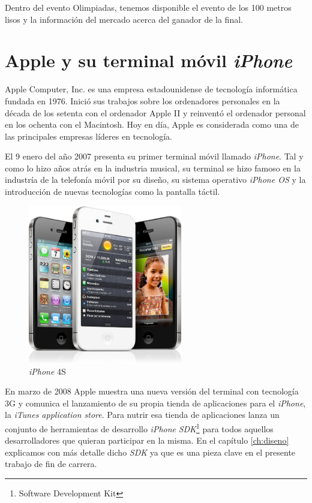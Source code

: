  Dentro del evento Olimpiadas, tenemos disponible el evento de los 100 metros lisos y la información del mercado acerca del ganador de la final.
 
\section{Apple y su terminal móvil \emph{iPhone}}
 
Apple Computer, Inc. es una empresa estadounidense de tecnología informática fundada en 1976. Inició sus trabajos sobre los ordenadores personales en la década de los setenta con el ordenador Apple II y reinventó el ordenador personal en los ochenta con el Macintosh. Hoy en día, Apple es considerada como una de las principales empresas líderes en tecnología.

El 9 enero del año 2007 presenta su primer terminal móvil llamado \emph{iPhone}. Tal y como lo hizo años atrás en la industria musical, su terminal se hizo famoso en la industría de la telefonía móvil por su diseño, su sistema operativo \emph{iPhone OS} y la introducción de nuevas tecnologías como la pantalla táctil.

\begin{figure} [h]
  \centering
    \includegraphics[width=0.6\textwidth]{./images/iphone4.jpg} 
  \caption{\emph{iPhone} 4S}
  \label{fig:iPhone-4GS}
\end{figure}
  
  En marzo de 2008 Apple muestra una nueva versión del terminal con tecnología 3G y comunica el lanzamiento de su propia tienda de aplicaciones para el \emph{iPhone}, la \emph{iTunes application store}. Para nutrir esa tienda de aplicaciones  lanza un conjunto de herramientas de desarrollo \emph{iPhone} \emph{SDK}\footnote{Software Development Kit} para todos aquellos desarrolladores que quieran participar en la misma. En el capítulo \ref{ch:diseno}  explicamos con más detalle dicho \emph{SDK} ya que es una pieza clave en el presente trabajo de fin de carrera.
  
